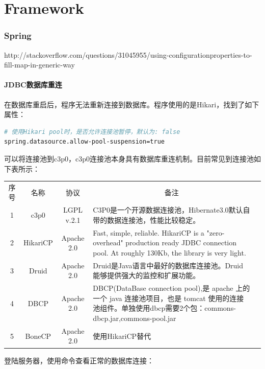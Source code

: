 \documentclass[letter]{book}
\begin{document}


\part{Framework}


\section*{Spring}

http://stackoverflow.com/questions/31045955/using-configurationproperties-to-fill-map-in-generic-way

\subsection*{JDBC数据库重连}

在数据库重启后，程序无法重新连接到数据库。程序使用的是Hikari，找到了如下属性：

\begin{lstlisting}[language=Bash]
# 使用Hikari pool时，是否允许连接池暂停，默认为: false
spring.datasource.allow-pool-suspension=true
\end{lstlisting}

可以将连接池到c3p0，c3p0连接池本身具有数据库重连机制。目前常见到连接池如下表所示：

\begin{tabular}{|c|c|c|p{8cm}|c|}
	\hline
	\multirow{1}{*}{序号}
	& \multicolumn{1}{c|}{名称}  
	& \multicolumn{1}{c|}{协议} 
	& \multicolumn{1}{c|}{备注}\\			
	\cline{1-4}
	1 & c3p0 &  LGPL v.2.1  & C3P0是一个开源数据连接池，Hibernate3.0默认自带的数据连接池，性能比较稳定。\\
	\hline
	2 & HikariCP & Apache 2.0 & Fast, simple, reliable. HikariCP is a "zero-overhead" production ready JDBC connection pool. At roughly 130Kb, the library is very light. \\
	\hline
	3 & Druid & Apache 2.0 & Druid是Java语言中最好的数据库连接池。Druid能够提供强大的监控和扩展功能。 \\
	\hline
	4 & DBCP & Apache 2.0 & DBCP(DataBase connection pool),是 apache 上的一个 java 连接池项目，也是 tomcat 使用的连接池组件。单独使用dbcp需要2个包：commons-dbcp.jar,commons-pool.jar \\
	\hline
	5 & BoneCP & Apache 2.0 & 使用HikariCP替代\\
	\hline
\end{tabular}

登陆服务器，使用命令查看正常的数据库连接：
\end{document}
